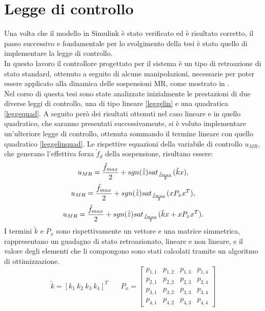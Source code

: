 \section{Legge di controllo}
Una volta che il modello in Simulink è stato verificato ed è risultato corretto, il passo successivo e fondamentale per lo svolgimento della tesi è stato quello di implementare la legge di controllo.\\
In questo lavoro il controllore progettato per il sistema è un tipo di retroazione di stato standard, ottenuto a seguito di alcune manipolazioni, necessarie per poter essere applicato alla dinamica delle sospensioni MR, come mostrato in \cite{controlMRdampers}.\\
Nel corso di questa tesi sono state analizzate inizialmente le prestazioni di due diverse leggi di controllo, una di tipo lineare \eqref{leggelin} e una quadratica \eqref{leggequad}. A seguito però dei risultati ottenuti nel caso lineare e in quello quadratico, che saranno presentati successivamente, si è voluto implementare un'ulteriore legge di controllo, ottenuta sommando il termine lineare con quello quadratico \eqref{leggelinquad}. Le rispettive equazioni della variabile di controllo $u_{MR}$, che generano l'effettiva forza $\tilde{f}_d$ della sospensione, risultano essere:
\begin{equation}
	\centering
	u_{MR} = \frac{\tilde{f}_{max}}{2} + sgn(\dot{\tilde{z}})sat_{\frac{\tilde{f}_{max}}{2}}(\tilde{k}x),
	\label{leggelin}
\end{equation}
\begin{equation}
	\centering
	u_{MR} = \frac{\tilde{f}_{max}}{2} + sgn(\dot{\tilde{z}})sat_{\frac{\tilde{f}_{max}}{2}}(xP_xx^T),
	\label{leggequad}
\end{equation}
\begin{equation}
	\centering
	u_{MR} = \frac{\tilde{f}_{max}}{2} + sgn(\dot{\tilde{z}})sat_{\frac{\tilde{f}_{max}}{2}}(\tilde{k}x + xP_xx^T).
	\label{leggelinquad}
\end{equation}
I termini $\tilde{k}$ e $P_x$ sono rispettivamente un vettore e una matrice simmetrica, rappresentano un guadagno di stato retroazionato, lineare e non lineare, e il valore degli elementi che li compongono sono stati calcolati tramite un algoritmo di ottimizzazione.\begin{equation*}
	\tilde{k} = [k_1 \ k_2 \ k_3 \ k_4]^T \ \ \ \ \ \ \ \
	P_x = 
	\begin{bmatrix}
		p_{1,1} & p_{1,2} & p_{1,3} & p_{1,4} \\
		p_{2,1} & p_{2,2} & p_{2,3} & p_{2,4} \\
		p_{3,1} & p_{3,2} & p_{3,3} & p_{3,4} \\
		p_{4,1} & p_{4,2} & p_{4,3} & p_{4,4}
	\end{bmatrix}
\end{equation*}
















